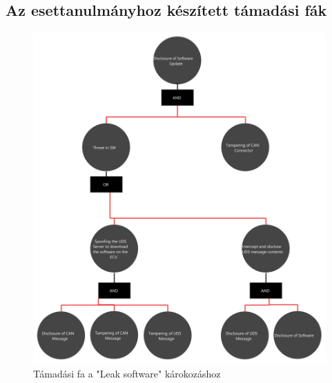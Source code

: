\appendix
\chapter*{\fuggelek}
\setcounter{chapter}{\appendixnumber}

\section{Az esettanulmányhoz készített támadási fák}
\begin{figure}[!ht]
\centering
\includegraphics[width=120mm, keepaspectratio]{figures/AT-SECSW-00.png}
\caption{Támadási fa a "Leak software" károkozáshoz} 
\label{fig:ff_leak_sw}
\end{figure}
